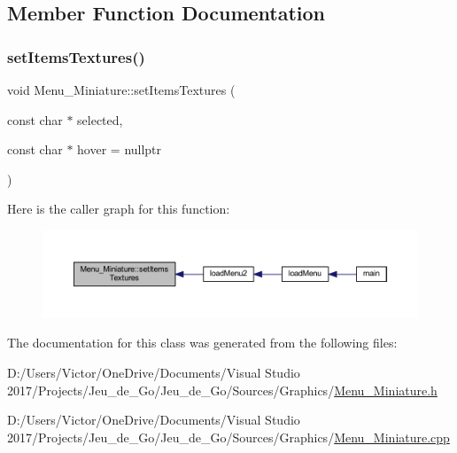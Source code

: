 \subsection{Member Function Documentation}
\mbox{\label{class_menu___miniature_afad04c066c7e436bbf9cccde310d07dc}} 
\subsubsection{\texorpdfstring{set\+Items\+Textures()}{setItemsTextures()}}
{\footnotesize\ttfamily void Menu\+\_\+\+Miniature\+::set\+Items\+Textures (\begin{DoxyParamCaption}\item[{const char $\ast$}]{selected,  }\item[{const char $\ast$}]{hover = {\ttfamily nullptr} }\end{DoxyParamCaption})\hspace{0.3cm}{\ttfamily [virtual]}}

Here is the caller graph for this function\+:\nopagebreak
\begin{figure}[H]
\begin{center}
\leavevmode
\includegraphics[width=350pt]{class_menu___miniature_afad04c066c7e436bbf9cccde310d07dc_icgraph}
\end{center}
\end{figure}


The documentation for this class was generated from the following files\+:\begin{DoxyCompactItemize}
\item 
D\+:/\+Users/\+Victor/\+One\+Drive/\+Documents/\+Visual Studio 2017/\+Projects/\+Jeu\+\_\+de\+\_\+\+Go/\+Jeu\+\_\+de\+\_\+\+Go/\+Sources/\+Graphics/\hyperlink{_menu___miniature_8h}{Menu\+\_\+\+Miniature.\+h}\item 
D\+:/\+Users/\+Victor/\+One\+Drive/\+Documents/\+Visual Studio 2017/\+Projects/\+Jeu\+\_\+de\+\_\+\+Go/\+Jeu\+\_\+de\+\_\+\+Go/\+Sources/\+Graphics/\hyperlink{_menu___miniature_8cpp}{Menu\+\_\+\+Miniature.\+cpp}\end{DoxyCompactItemize}
